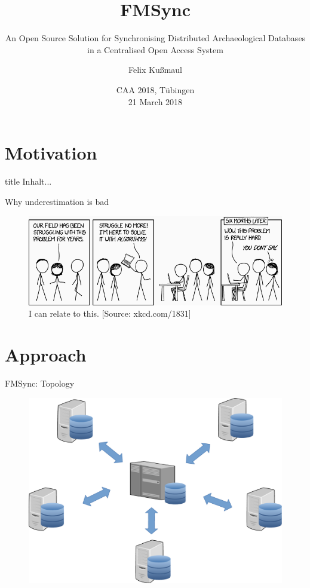 \documentclass[xcolor=x11names, aspectratio=169,usenames,dvipsnames]{beamer}
\author[Felix Kußmaul]{\large Felix Kußmaul\inst{1}}
\title[FMSync]{\Large FMSync}
\subtitle{\normalsize An Open Source Solution for Synchronising Distributed Archaeological Databases in a Centralised Open Access System}
\institute[Cologne]{\inst{1} Archäologisches Institut, Universität zu Köln}
\date[\today]{\vspace*{1em}CAA 2018, Tübingen\\[.5em] 21 March 2018\vspace*{1em}}
\begin{document}
\begin{frame}[plain]
\titlepage
\end{frame}

\section{Motivation}

\begin{frame}{title}
Inhalt...
\end{frame}

\begin{frame}{Why underestimation is bad}
\begin{center}
	\begin{figure}
		\includegraphics[width=\textwidth]{img/xkcd.png}
		\caption{I can relate to this. [Source: xkcd.com/1831]}
	\end{figure}
\end{center}
\end{frame}

\section{Approach}

\begin{frame}{FMSync: Topology}
\begin{figure}
	\includegraphics[height=.8\textheight]{img/topo.pdf}
\end{figure}
\end{frame}
\end{document}
